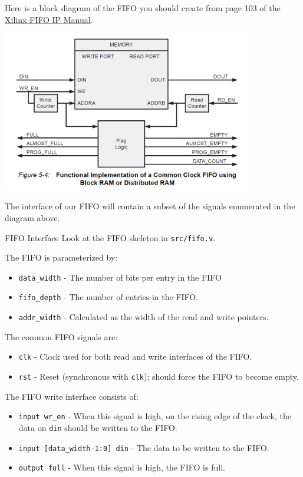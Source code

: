 \documentclass[11pt]{article}
\makeatletter
\renewcommand{\subsection}
{\@startsection {subsection}{1}{0pt}
 {-1ex}
 {0.5ex}
 {\bfseries\normalsize}}
\makeatother
\begin{document}
Here is a block diagram of the FIFO you should create from page 103 of the \href{https://www.xilinx.com/support/documentation/ip_documentation/fifo_generator_ug175.pdf}{Xilinx FIFO IP Manual}.

\begin{center}
    \includegraphics[height=7cm]{sync_fifo_diagram.png}
\end{center}

The interface of our FIFO will contain a subset of the signals enumerated in the diagram above.

\subsection{FIFO Interface}
Look at the FIFO skeleton in \verb|src/fifo.v|.

The FIFO is parameterized by:
\begin{itemize}
    \item \verb|data_width| - The number of bits per entry in the FIFO
    \item \verb|fifo_depth| - The number of entries in the FIFO.
    \item \verb|addr_width| - Calculated as the width of the read and write pointers.
\end{itemize}

The common FIFO signals are:
\begin{itemize}
    \item \verb|clk| - Clock used for both read and write interfaces of the FIFO.
    \item \verb|rst| - Reset (synchronous with \verb|clk|); should force the FIFO to become empty.
\end{itemize}

The FIFO write interface consists of:
\begin{itemize}
    \item \verb|input wr_en| - When this signal is high, on the rising edge of the clock, the data on \verb|din| should be written to the FIFO.
    \item \verb|input [data_width-1:0] din| - The data to be written to the FIFO.
    \item \verb|output full| - When this signal is high, the FIFO is full.
\end{itemize}
\end{document}
